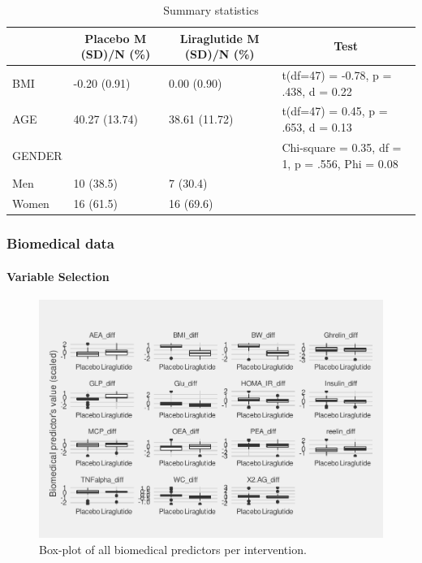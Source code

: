 \documentclass[
]{article}
\begin{document}
\begin{table}[H]

\caption{\label{tab:demographics}Summary statistics}
\centering
\begin{tabular}[t]{l|l|l|l}
\hline
\multicolumn{1}{c}{\textbf{}} & \multicolumn{1}{c}{\textbf{Placebo M (SD)/N (\%)}} & \multicolumn{1}{c}{\textbf{Liraglutide M (SD)/N (\%)}} & \multicolumn{1}{c}{\textbf{Test}}\\
\hline
BMI & -0.20 (0.91) & 0.00 (0.90) & t(df=47) = -0.78, p = .438, d = 0.22\\
\hline
AGE & 40.27 (13.74) & 38.61 (11.72) & t(df=47) = 0.45, p = .653, d = 0.13\\
\hline
GENDER &  &  & Chi-square = 0.35, df = 1, p = .556, Phi = 0.08\\
\hline
Men & 10 (38.5) & 7 (30.4) & \\
\hline
Women & 16 (61.5) & 16 (69.6) & \\
\hline
\end{tabular}
\end{table}

\hypertarget{biomedical-data}{%
\subsubsection{Biomedical data}\label{biomedical-data}}

\hypertarget{variable-selection}{%
\paragraph{Variable Selection}\label{variable-selection}}

\begin{figure}

{\centering \includegraphics[width=0.9\linewidth]{OBIWAN_LIRA_files/figure-latex/var_plot-1} 

}

\caption{Box-plot of all biomedical predictors per intervention.}\label{fig:var_plot}
\end{figure}
\end{document}
